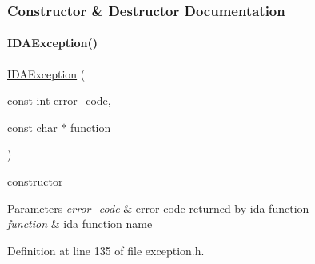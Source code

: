 \subsubsection{Constructor \& Destructor Documentation}
\mbox{\label{classamici_1_1_i_d_a_exception_ac01f061945cc83140822b1e6c69761fb}} 
\paragraph{\texorpdfstring{I\+D\+A\+Exception()}{IDAException()}}
{\footnotesize\ttfamily \mbox{\hyperlink{classamici_1_1_i_d_a_exception}{I\+D\+A\+Exception}} (\begin{DoxyParamCaption}\item[{const int}]{error\+\_\+code,  }\item[{const char $\ast$}]{function }\end{DoxyParamCaption})}

constructor 
\begin{DoxyParams}{Parameters}
{\em error\+\_\+code} & error code returned by ida function \\
\hline
{\em function} & ida function name \\
\hline
\end{DoxyParams}


Definition at line 135 of file exception.\+h.

